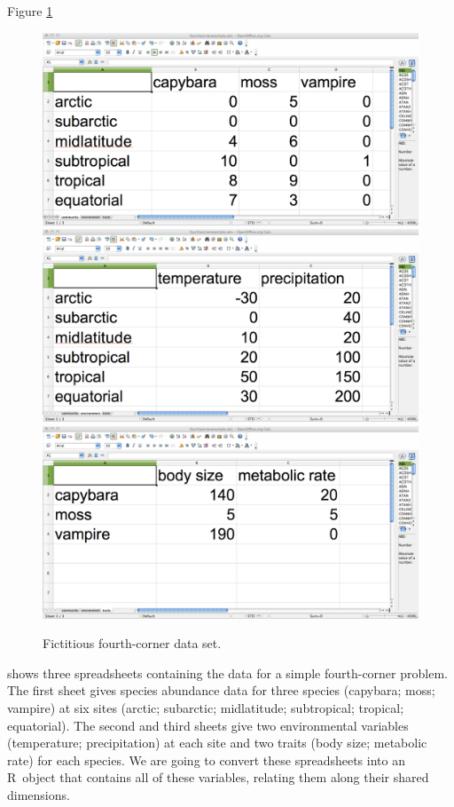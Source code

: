\documentclass{article}
\newcommand{\R}{{\sf R}}
\numberwithin{exercise}{section}
\begin{document}
Figure \ref{fig:spreadsheetfc} \begin{figure}
\label{fig:spreadsheetfc}
\includegraphics{./readingmultipletables/community.pdf}
\includegraphics{./readingmultipletables/environment.pdf}
\includegraphics{./readingmultipletables/traits.pdf}
\caption{Fictitious fourth-corner data set.}
\end{figure}shows three spreadsheets containing the data for a simple fourth-corner problem.  The first sheet gives species abundance data for three species (capybara; moss; vampire) at six sites (arctic; subarctic; midlatitude; subtropical; tropical; equatorial).  The second and third sheets give two environmental variables (temperature; precipitation) at each site and two traits (body size; metabolic rate) for each species.  We are going to convert these spreadsheets into an \R\ object that contains all of these variables, relating them along their shared dimensions.
\end{document}
